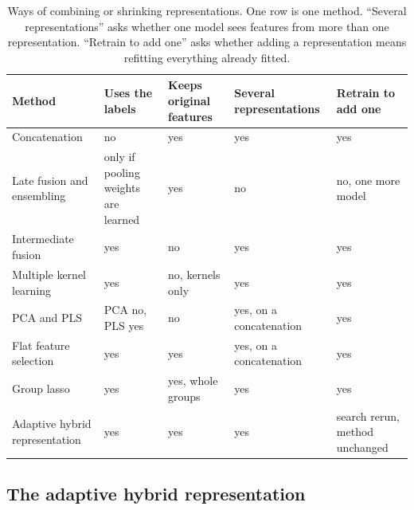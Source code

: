 \begin{table}[htbp]
\centering
\small
\setlength{\tabcolsep}{3pt}
\caption[Ways of combining or shrinking representations.]{Ways of combining or shrinking representations. One row is one method. ``Several representations'' asks whether one model sees features from more than one representation. ``Retrain to add one'' asks whether adding a representation means refitting everything already fitted.}
\label{tab:hybrid_alternatives}
\begin{adjustbox}{max width=\textwidth}
\begin{tabular}{P{4.2cm}P{2.3cm}P{2.1cm}P{2.3cm}P{2.6cm}}
\toprule
Method & Uses the labels & Keeps original features & Several representations & Retrain to add one \\
\midrule
Concatenation \citep{Stahlschmidt2022} & no & yes & yes & yes \\
Late fusion and ensembling \citep{Steyaert2023, Valsecchi2020} & only if pooling weights are learned & yes & no & no, one more model \\
Intermediate fusion \citep{Wang2021} & yes & no & yes & yes \\
Multiple kernel learning \citep{Gonen2011, Cichonska2018} & yes & no, kernels only & yes & yes \\
PCA and PLS \citep{Jolliffe2016, Wold2001} & PCA no, PLS yes & no & yes, on a concatenation & yes \\
Flat feature selection \citep{Guyon2003} & yes & yes & yes, on a concatenation & yes \\
Group lasso \citep{Yuan2006} & yes & yes, whole groups & yes & yes \\
Adaptive hybrid representation & yes & yes & yes & search rerun, method unchanged \\
\bottomrule
\end{tabular}
\end{adjustbox}
\end{table}
\subsection{The adaptive hybrid representation}

